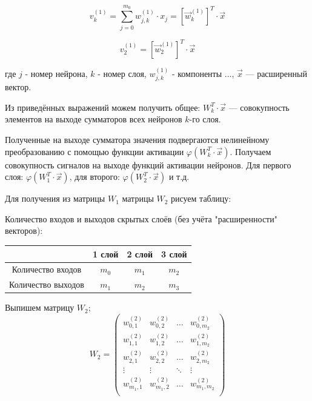 \documentclass{article}
\numberwithin{equation}{subsection}
\begin{document}

\begin{equation}
    {v}_k^{(1)} = \sum_{j=0}^{m_0} w_{j,k}^{(1)} \cdot x_j = [\vec{w}_{k}^{(1)}]^T \cdot \vec{x}
\end{equation}


\begin{equation*}
    {v}_2^{(1)} = [\vec{w}_{2}^{(1)}]^T \cdot \vec{x}
\end{equation*}

где $j$ - номер нейрона, $k$ - номер слоя, $w_{j,k}^{(1)}$ - компоненты ..., $\vec{x}$ ---
 расширенный вектор.

Из приведённых выражений можем получить общее: $W_k^T \cdot \vec{x}$ --- совокупность элементов 
на выходе сумматоров всех нейронов $k$-го слоя.

Полученные на выходе сумматора значения подвергаются нелинейному преобразованию 
с помощью функции активации $\varphi(W_k^T \cdot \vec{x})$. Получаем совокупность 
сигналов на выходе функций активации нейронов. 
Для первого слоя: $\varphi(W_1^T \cdot \vec{x})$, для второго: $\varphi(W_2^T \cdot \vec{x})$ и т.д.

Для получения из матрицы $W_1$ матрицы $W_2$ рисуем таблицу:

\begin{center}
    Количество входов и выходов скрытых слоёв (без учёта "расширенности" векторов):

    \begin{tabular}{c | c |  c | c |}
        & 1 слой & 2 слой & 3 слой \\
        \hline
        Количество входов  & $m_0$ & $m_1$ & $m_2$ \\
        \hline
        Количество выходов & $m_1$ & $m_2$ & $m_3$ \\
        \hline
    \end{tabular}
\end{center}

Выпишем матрицу $W_2$;
\begin{equation}
    W_2 = 
    \begin{pmatrix}
        w_{0,1}^{(2)} & w_{0,2}^{(2)} & \dots & w_{0,{m_2}}^{(2)} \\
        w_{1,1}^{(2)} & w_{1,2}^{(2)} & \dots & w_{1,{m_2}}^{(2)} \\
        w_{2,1}^{(2)} & w_{2,2}^{(2)} & \dots & w_{2,{m_2}}^{(2)} \\
        \vdots        & \vdots        & \ddots & \vdots           \\
        w_{{m_1},1}^{(2)} & w_{{m_1},2}^{(2)} & \dots & w_{{m_1},{m_2}}^{(2)} \\
    \end{pmatrix}
\end{equation}
\end{document}
